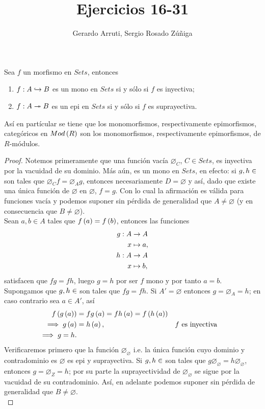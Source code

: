 \documentclass{article}
\title{Ejercicios 16-31}
\author{Gerardo Arruti, Sergio Rosado Zúñiga}
\date{}
\begin{document}
	\maketitle
	\begin{lem}
		Sea $f$ un morfismo en $Sets$, entonces
		\begin{enumerate}[label=$\alph*)$]
			\item $\catarrow{f}{A}{B}{m}$ es un mono en $Sets$ si y sólo si $f$ es inyectiva;
			\item $\catarrow{f}{A}{B}{e}$ es un epi en $Sets$ si y sólo si $f$ es suprayectiva.
		\end{enumerate}
		Así en partícular se tiene que los monomorfismos, respectivamente epimorfismos, categóricos en $Mod\left(R\right)$ son los monomorfismos, respectivamente epimorfismos, de $R$-módulos.
		\begin{proof}
			 Notemos primeramente que una función vacía $\varnothing_C$, $C\in Sets$, es inyectiva por la vacuidad de su dominio. Más aún, es un mono en $Sets$, en efecto: si $g,h\in\ringmod{Sets}{D}{\varnothing}$ son tales que $\varnothing_C f=\varnothing_A g$, entonces necesariamente $D=\varnothing$ y así, dado que existe una única función de $\varnothing$ en $\varnothing$, $f=g$. Con lo cual la afirmación es válida para funciones vacía y podemos suponer sin pérdida de generalidad que $A\neq\varnothing$ (y en consecuencia que $B\neq\varnothing$).\\
			 Sean $a,b\in A$ tales que $f\left(a\right)=f\left(b\right)$, entonces las funciones
			\begin{align*}
				g: A &\rightarrow A\\ x &\mapsto a,\\
				h: A &\rightarrow A\\ x &\mapsto b,
			\end{align*}
			satisfacen que $fg=fh$, luego $g=h$ por  ser $f$ mono y por tanto $a=b$.\\
			 Supongamos que  $g,h\in\ringmod{Sets}{A'}{A}$ son tales que $fg=fh$. Si $A'=\varnothing$ entonces $g=\varnothing_A=h$; en caso contrario sea $a\in A'$, así
			\begin{align*}
				f\left(g\left(a\right)\right)&=fg\left(a\right)=fh\left(a\right)=f\left(h\left(a\right)\right)\\
				\implies g\left(a\right)&=h\left(a\right), && f\text{ es inyectiva}\\
				\implies g=h.
			\end{align*}
			 Verificaremos primero que la función $\varnothing_\varnothing$ i.e. la única función cuyo dominio y contradominio es $\varnothing$ es epi y suprayectiva. Si  $g,h\in\ringmod{Sets}{\varnothing}{Z}$ son tales que $g\varnothing_\varnothing=h\varnothing_\varnothing$, entonces $g=\varnothing_Z=h$; por su parte la suprayectividad de $\varnothing_\varnothing$ se sigue por la vacuidad de su contradominio. Así, en adelante podemos suponer sin pérdida de generalidad que $B\neq\varnothing$.\\

\end{proof}
\end{lem}
\end{document}

